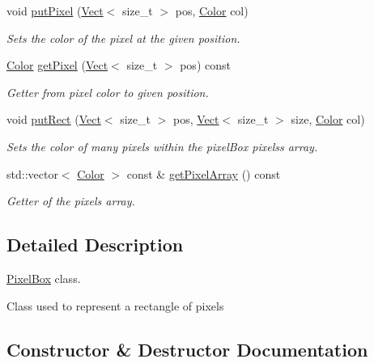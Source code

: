 \begin{DoxyCompactItemize}
void \hyperlink{class_arcade_1_1_pixel_box_a517214a6fd2fc9007aabe0f4a013ca0c}{put\+Pixel} (\hyperlink{class_arcade_1_1_vect}{Vect}$<$ size\+\_\+t $>$ pos, \hyperlink{class_arcade_1_1_color}{Color} col)
\begin{DoxyCompactList}\small\item\em Sets the color of the pixel at the given position. \end{DoxyCompactList}\item 
\hyperlink{class_arcade_1_1_color}{Color} \hyperlink{class_arcade_1_1_pixel_box_afbbc61f220999095290e62a6eb413301}{get\+Pixel} (\hyperlink{class_arcade_1_1_vect}{Vect}$<$ size\+\_\+t $>$ pos) const
\begin{DoxyCompactList}\small\item\em Getter from pixel color to given position. \end{DoxyCompactList}\item 
void \hyperlink{class_arcade_1_1_pixel_box_ac93dc2a0d6f36f11bf798aafac8968f0}{put\+Rect} (\hyperlink{class_arcade_1_1_vect}{Vect}$<$ size\+\_\+t $>$ pos, \hyperlink{class_arcade_1_1_vect}{Vect}$<$ size\+\_\+t $>$ size, \hyperlink{class_arcade_1_1_color}{Color} col)
\begin{DoxyCompactList}\small\item\em Sets the color of many pixels within the pixel\+Box pixels\textquotesingle{}s array. \end{DoxyCompactList}\item 
std\+::vector$<$ \hyperlink{class_arcade_1_1_color}{Color} $>$ const  \& \hyperlink{class_arcade_1_1_pixel_box_a85ebca9e42c237f806d00d510b504001}{get\+Pixel\+Array} () const
\begin{DoxyCompactList}\small\item\em Getter of the pixels array. \end{DoxyCompactList}\end{DoxyCompactItemize}


\subsection{Detailed Description}
\hyperlink{class_arcade_1_1_pixel_box}{Pixel\+Box} class. 

Class used to represent a rectangle of pixels 

\subsection{Constructor \& Destructor Documentation}
\mbox{\label{class_arcade_1_1_pixel_box_adec96dbc5af889192e59ace1330f573e}} 
